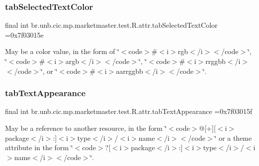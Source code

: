 \subsubsection{\texorpdfstring{tab\+Selected\+Text\+Color}{tabSelectedTextColor}}
{\footnotesize\ttfamily final int br.\+unb.\+cic.\+mp.\+marketmaster.\+test.\+R.\+attr.\+tab\+Selected\+Text\+Color =0x7f03015e\hspace{0.3cm}{\ttfamily [static]}}

May be a color value, in the form of \char`\"{}$<$code$>$\#$<$i$>$rgb$<$/i$>$$<$/code$>$\char`\"{}, \char`\"{}$<$code$>$\#$<$i$>$argb$<$/i$>$$<$/code$>$\char`\"{}, \char`\"{}$<$code$>$\#$<$i$>$rrggbb$<$/i$>$$<$/code$>$\char`\"{}, or \char`\"{}$<$code$>$\#$<$i$>$aarrggbb$<$/i$>$$<$/code$>$\char`\"{}. \mbox{\label{classbr_1_1unb_1_1cic_1_1mp_1_1marketmaster_1_1test_1_1R_1_1attr_ae7b30ba8e65b8b22e73f4efe04c33967}} 
\subsubsection{\texorpdfstring{tab\+Text\+Appearance}{tabTextAppearance}}
{\footnotesize\ttfamily final int br.\+unb.\+cic.\+mp.\+marketmaster.\+test.\+R.\+attr.\+tab\+Text\+Appearance =0x7f03015f\hspace{0.3cm}{\ttfamily [static]}}

May be a reference to another resource, in the form \char`\"{}$<$code$>$@\mbox{[}+\mbox{]}\mbox{[}$<$i$>$package$<$/i$>$\+:\mbox{]}$<$i$>$type$<$/i$>$/$<$i$>$name$<$/i$>$$<$/code$>$\char`\"{} or a theme attribute in the form \char`\"{}$<$code$>$?\mbox{[}$<$i$>$package$<$/i$>$\+:\mbox{]}$<$i$>$type$<$/i$>$/$<$i$>$name$<$/i$>$$<$/code$>$\char`\"{}. \mbox{\label{classbr_1_1unb_1_1cic_1_1mp_1_1marketmaster_1_1test_1_1R_1_1attr_adb956a72ffb82a05a9311ffc37221809}} 
